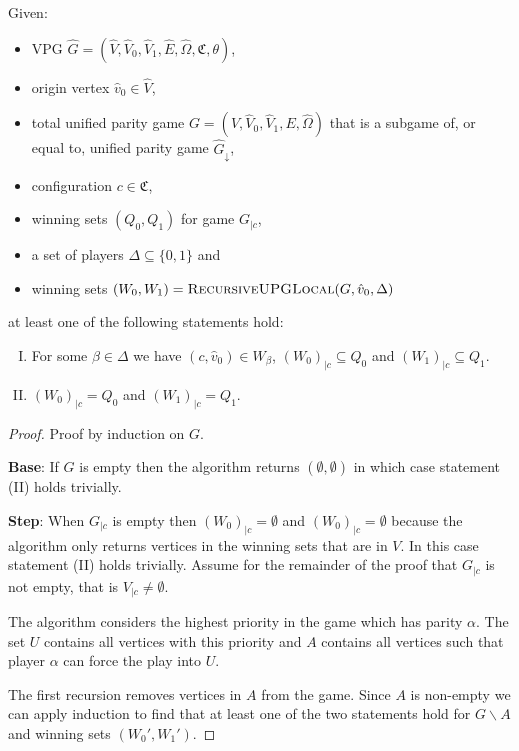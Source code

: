 \begin{theorem}
	Given:
	\begin{itemize}
		\item VPG $\hat{G} = (\hat{V}, \hat{V}_0,\hat{V}_1,\hat{E},\hat{\Omega},\mathfrak{C},\theta)$,
		\item origin vertex $\hat{v}_0 \in \hat{V}$,
		\item total unified parity game $G = (V, \hat{V}_0, \hat{V}_1,E,\hat{\Omega})$ that is a subgame of, or equal to, unified parity game $\hat{G}_{\downarrow}$,
		\item configuration $c\in \mathfrak{C}$,
		\item winning sets $(Q_0,Q_1)$ for game $G_{|c}$,
		\item a set of players $\Delta \subseteq \{0,1\}$ and
		\item winning sets $(W_0, W_1) = \textsc{RecursiveUPGLocal}(G,\hat{v}_0,\Delta)$
	\end{itemize}
	at least one of the following statements hold:
	\begin{enumerate}[(I)]
		\item For some $\beta \in \Delta$ we have $(c,\hat{v}_0) \in W_\beta$, $(W_0)_{|c} \subseteq Q_0$ and $(W_1)_{|c} \subseteq Q_1$.
		\item $(W_0)_{|c} = Q_0$ and $(W_1)_{|c} = Q_1$.
	\end{enumerate}
	\begin{proof}
		Proof by induction on $G$.
		
		\textbf{Base}: If $G$ is empty then the algorithm returns $(\emptyset,\emptyset)$ in which case statement (II) holds trivially.
		
		\textbf{Step}:
		When $G_{|c}$ is empty then $(W_0)_{|c} = \emptyset$ and $(W_0)_{|c} = \emptyset$ because the algorithm only returns vertices in the winning sets that are in $V$. In this case statement (II) holds trivially. Assume for the remainder of the proof that $G_{|c}$ is not empty, that is $V_{|c} \neq \emptyset$.
		
		The algorithm considers the highest priority in the game which has parity $\alpha$. The set $U$ contains all vertices with this priority and $A$ contains all vertices such that player $\alpha$ can force the play into $U$.
		
		The first recursion removes vertices in $A$ from the game. Since $A$ is non-empty we can apply induction to find that at least one of the two statements hold for $G\backslash A$ and winning sets $(W_0',W_1')$.
		

\end{proof}
\end{theorem}
